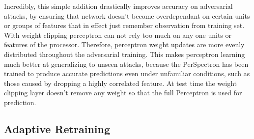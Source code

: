 Incredibly, this simple addition drastically improves accuracy on adversarial attacks, by ensuring that network doesn't become overdependant on certain units or groups of features that in effect just remember observation from training set. With weight clipping perceptron can not rely too much on any one units or features of the processor. Therefore, perceptron weight updates are more evenly distributed throughout the adversarial training. This makes perceptron learning much better at generalizing to unseen attacks, because the PerSpectron has been trained to produce accurate predictions even under unfamiliar conditions, such as those caused by dropping a highly correlated feature. At test time the weight clipping layer doesn't remove any weight so that the full Perceptron is used for prediction. 
\subsection{Adaptive Retraining}